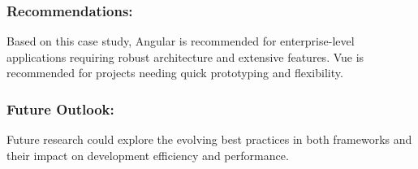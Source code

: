\subsubsection{Recommendations: }Based on this case study, Angular is recommended for enterprise-level applications requiring robust architecture and extensive features. Vue is recommended for projects needing quick prototyping and flexibility.
\subsubsection{Future Outlook: }Future research could explore the evolving best practices in both frameworks and their impact on development efficiency and performance.

